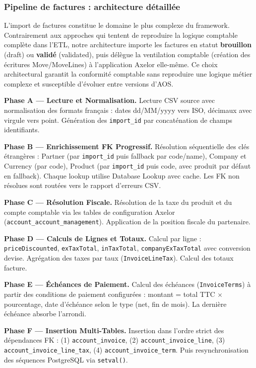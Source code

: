 \documentclass[a4paper,12pt]{article}
\begin{document}
\subsubsection{Pipeline de factures : architecture détaillée}

L'import de factures constitue le domaine le plus complexe du framework. Contrairement aux approches qui tentent de reproduire la logique comptable complète dans l'ETL, notre architecture importe les factures en statut \textbf{brouillon} (draft) ou \textbf{validé} (validated), puis délègue la ventilation comptable (création des écritures Move/MoveLines) à l'application Axelor elle-même. Ce choix architectural garantit la conformité comptable sans reproduire une logique métier complexe et susceptible d'évoluer entre versions d'AOS.

\medskip
\noindent\textbf{Phase A — Lecture et Normalisation.}
Lecture CSV source avec normalisation des formats français : dates dd/MM/yyyy vers ISO, décimaux avec virgule vers point. Génération des \texttt{import\_id} par concaténation de champs identifiants.

\medskip
\noindent\textbf{Phase B — Enrichissement FK Progressif.}
Résolution séquentielle des clés étrangères : Partner (par \texttt{import\_id} puis fallback par code/name), Company et Currency (par code), Product (par \texttt{import\_id} puis code, avec produit par défaut en fallback). Chaque lookup utilise Database Lookup avec cache. Les FK non résolues sont routées vers le rapport d'erreurs CSV.

\medskip
\noindent\textbf{Phase C — Résolution Fiscale.}
Résolution de la taxe du produit et du compte comptable via les tables de configuration Axelor (\texttt{account\_account\_management}). Application de la position fiscale du partenaire.

\medskip
\noindent\textbf{Phase D — Calculs de Lignes et Totaux.}
Calcul par ligne : \texttt{priceDiscounted}, \texttt{exTaxTotal}, \texttt{inTaxTotal}, \texttt{companyExTaxTotal} avec conversion devise. Agrégation des taxes par taux (\texttt{InvoiceLineTax}). Calcul des totaux facture.

\medskip
\noindent\textbf{Phase E — Échéances de Paiement.}
Calcul des échéances (\texttt{InvoiceTerms}) à partir des conditions de paiement configurées : montant = total TTC $\times$ pourcentage, date d'échéance selon le type (net, fin de mois). La dernière échéance absorbe l'arrondi.

\medskip
\noindent\textbf{Phase F — Insertion Multi-Tables.}
Insertion dans l'ordre strict des dépendances FK : (1) \texttt{account\_invoice}, (2) \texttt{account\_invoice\_line}, (3) \texttt{account\_invoice\_line\_tax}, (4) \texttt{account\_invoice\_term}. Puis resynchronisation des séquences PostgreSQL via \texttt{setval()}.
\end{document}
